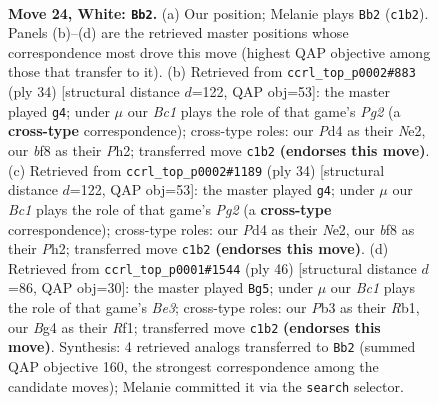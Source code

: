 \documentclass[11pt]{article}
\begin{document}
\clearpage

\begin{figure}[p]\centering
\begin{subfigure}{0.46\textwidth}\centering
\resizebox{\linewidth}{!}{%
\newchessgame
\chessboard[
  setfen={1n1qkb1r/1Q2n3/r1p3p1/p2p2P1/1p1P2Bp/1P5P/P1P1KP2/R1BNR3 w - - 1 24},
  showmover=false,
  pgfstyle=straightmove, color=movearrow, markmove={c1-b2}
]}
\caption{}
\end{subfigure}\hfill
\begin{subfigure}{0.46\textwidth}\centering
\resizebox{\linewidth}{!}{%
\newchessgame
\chessboard[
  setfen={2q2rk1/r2n1ppp/3Q1b2/p3pP2/1p3P2/5B2/PPP1N1PP/1K1R3R w - - 1 18},
  showmover=false,
  pgfstyle=straightmove, color=movearrow, markmove={g2-g4}
]}
\caption{}
\end{subfigure}
\\[4pt]
\begin{subfigure}{0.46\textwidth}\centering
\resizebox{\linewidth}{!}{%
\newchessgame
\chessboard[
  setfen={2q2rk1/r2n1ppp/3Q1b2/p3pP2/1p3P2/5B2/PPP1N1PP/1K1R3R w - - 1 18},
  showmover=false,
  pgfstyle=straightmove, color=movearrow, markmove={g2-g4}
]}
\caption{}
\end{subfigure}\hfill
\begin{subfigure}{0.46\textwidth}\centering
\resizebox{\linewidth}{!}{%
\newchessgame
\chessboard[
  setfen={2r3k1/1p1b2qp/p2n1rn1/1p1P1p1Q/3Pp3/4B1PN/P4PBP/1R3R1K w - - 2 24},
  showmover=false,
  pgfstyle=straightmove, color=movearrow, markmove={e3-g5}
]}
\caption{}
\end{subfigure}
\caption{\textbf{Move 24, White: \texttt{Bb2}.} (a) Our position; Melanie plays \texttt{Bb2} (\texttt{c1b2}). Panels (b)--(d) are the retrieved master positions whose correspondence most drove this move (highest QAP objective among those that transfer to it). (b) Retrieved from \texttt{ccrl\_top\_p0002\#883} (ply 34) [structural distance $d$=122, QAP obj=53]: the master played \texttt{g4}; under $\mu$ our \emph{Bc1} plays the role of that game's \emph{Pg2} (a \textbf{cross-type} correspondence); cross-type roles: our \emph{P}d4 as their \emph{N}e2, our \emph{b}f8 as their \emph{P}h2; transferred move \texttt{c1b2} \textbf{(endorses this move)}. (c) Retrieved from \texttt{ccrl\_top\_p0002\#1189} (ply 34) [structural distance $d$=122, QAP obj=53]: the master played \texttt{g4}; under $\mu$ our \emph{Bc1} plays the role of that game's \emph{Pg2} (a \textbf{cross-type} correspondence); cross-type roles: our \emph{P}d4 as their \emph{N}e2, our \emph{b}f8 as their \emph{P}h2; transferred move \texttt{c1b2} \textbf{(endorses this move)}. (d) Retrieved from \texttt{ccrl\_top\_p0001\#1544} (ply 46) [structural distance $d$=86, QAP obj=30]: the master played \texttt{Bg5}; under $\mu$ our \emph{Bc1} plays the role of that game's \emph{Be3}; cross-type roles: our \emph{P}b3 as their \emph{R}b1, our \emph{B}g4 as their \emph{R}f1; transferred move \texttt{c1b2} \textbf{(endorses this move)}. Synthesis: 4 retrieved analogs transferred to \texttt{Bb2} (summed QAP objective 160, the strongest correspondence among the candidate moves); Melanie committed it via the \texttt{search} selector.}
\label{fig:thought-m46}
\end{figure}
\end{document}
